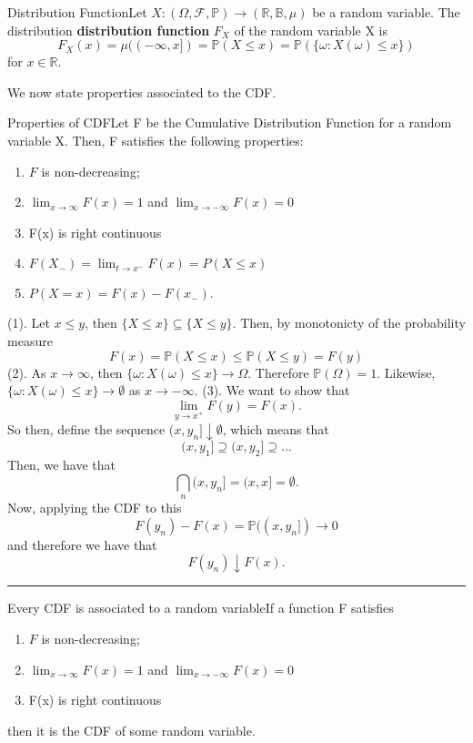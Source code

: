 \documentclass[twoside]{article}
\newenvironment{proof}{{\bf Proof:}}{\hfill\rule{2mm}{2mm}}
\newcommand{\prob}{\mathbb{P}}
\begin{document}
\begin{definition_exam}{Distribution Function}{}Let $X: (\Omega, \mathcal{F}, \prob) \rightarrow (\mathbb{R}, \mathbb{B}, \mu)$ be a random variable. The distribution \textbf{distribution function} $F_X$ of the random variable X is
$$
F_X(x) = \mu((-\infty, x]) = \prob(X \leq x) = \prob(\{\omega: X(\omega) \leq x\})
$$
for $x \in \mathbb{R}.$
\end{definition_exam}

We now state properties associated to the CDF.

\begin{theorem_exam}{Properties of CDF}{}Let F be the Cumulative Distribution Function for a random variable X. Then, F satisfies the following properties: 
\begin{enumerate}
\item $F$ is non-decreasing;
\item $\lim_{x \rightarrow \infty}F(x) = 1$ and $\lim_{x \rightarrow -\infty}F(x) = 0$
\item F(x) is right continuous
\item $F(X_-) = \lim_{t \rightarrow x^-}F(x) = P(X \leq x)$
\item $P(X = x) = F(x) - F(x_-).$
\end{enumerate}
\end{theorem_exam}

\begin{proof} (1). Let $x \leq y$, then $\{X \leq x\} \subseteq \{X \leq y\}.$ Then, by monotonicty of the probability measure
$$
F(x) = \prob(X \leq x) \leq \prob(X \leq y) = F(y)
$$
(2). As $x \rightarrow \infty$, then $\{\omega: X(\omega) \leq x\} \rightarrow \Omega.$ Therefore $\prob(\Omega) = 1.$ Likewise, $\{\omega: X(\omega) \leq x\} \rightarrow \emptyset$ as $x \rightarrow -\infty.$
\newline
(3). We want to show that 
$$
\lim_{y \rightarrow x^+}F(y) = F(x).
$$
So then, define the sequence $(x, y_n] \downarrow \emptyset$, which means that 
$$
(x, y_1] \supseteq (x, y_2] \supseteq ...
$$
Then, we have that 
$$
\bigcap_n(x, y_n] = (x,x] = \emptyset.
$$
Now, applying the CDF to this 
$$
F(y_n) - F(x) = \prob((x, y_n]) \rightarrow 0
$$
and therefore we have that 
$$
F(y_n) \downarrow F(x).
$$
\end{proof}

\begin{theorem_exam}{Every CDF is associated to a random variable}{}If a function F satisfies
\begin{enumerate}
\item $F$ is non-decreasing;
\item $\lim_{x \rightarrow \infty}F(x) = 1$ and $\lim_{x \rightarrow -\infty}F(x) = 0$
\item F(x) is right continuous
\end{enumerate}
then it is the CDF of some random variable.
\end{theorem_exam}
\end{document}
